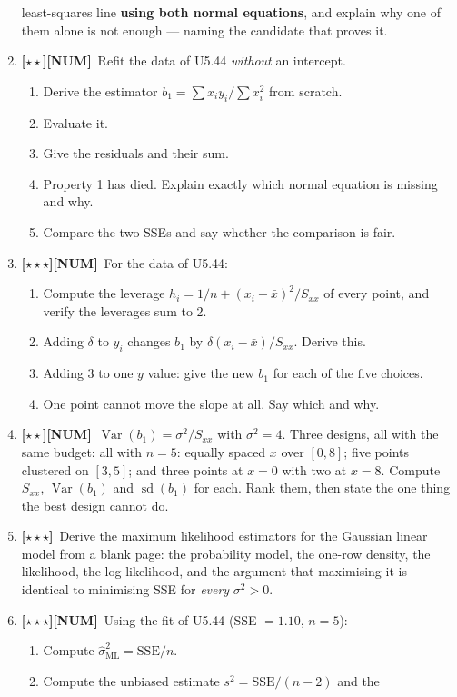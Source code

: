 \documentclass[11pt,a4paper]{article}
\newcommand{\LA}{{\footnotesize\textbf{[$\star\star\star$]}}}
\newcommand{\LB}{{\footnotesize\textbf{[$\star\star$]}}}
\newcommand{\NUM}{{\footnotesize\textbf{[NUM]}}}
\newcommand{\Q}[1]{\item[\textbf{#1}]}
\begin{document}
\begin{enumerate}[leftmargin=2.2cm]
  least-squares line \textbf{using both normal equations}, and explain why one
  of them alone is not enough --- naming the candidate that proves it.
\Q{U5.48}\LB\NUM\ Refit the data of U5.44 \emph{without} an intercept.
  \begin{enumerate}[label=(\alph*)]
    \item Derive the estimator $b_1 = \sum x_iy_i/\sum x_i^2$ from scratch.
    \item Evaluate it.
    \item Give the residuals and their sum.
    \item Property 1 has died. Explain exactly which normal equation is
      missing and why.
    \item Compare the two SSEs and say whether the comparison is fair.
  \end{enumerate}
\Q{U5.49}\LA\NUM\ For the data of U5.44:
  \begin{enumerate}[label=(\alph*)]
    \item Compute the leverage $h_i = 1/n + (x_i-\bar x)^2/S_{xx}$ of every
      point, and verify the leverages sum to 2.
    \item Adding $\delta$ to $y_i$ changes $b_1$ by $\delta(x_i-\bar x)/S_{xx}$.
      Derive this.
    \item Adding 3 to one $y$ value: give the new $b_1$ for each of the five
      choices.
    \item One point cannot move the slope at all. Say which and why.
  \end{enumerate}
\Q{U5.50}\LB\NUM\ $\operatorname{Var}(b_1) = \sigma^2/S_{xx}$ with
  $\sigma^2 = 4$. Three designs, all with the same budget:
  all with $n = 5$: equally spaced $x$ over $[0,8]$; five points clustered on
  $[3,5]$; and three points at $x=0$ with two at $x=8$.
  Compute $S_{xx}$, $\operatorname{Var}(b_1)$ and $\operatorname{sd}(b_1)$ for
  each. Rank them, then state the one thing the best design cannot do.
\Q{U5.51}\LA\ Derive the maximum likelihood estimators for the Gaussian linear
  model from a blank page: the probability model, the one-row density, the
  likelihood, the log-likelihood, and the argument that maximising it is
  identical to minimising SSE for \emph{every} $\sigma^2 > 0$.
\Q{U5.52}\LA\NUM\ Using the fit of U5.44 (SSE $= 1.10$, $n = 5$):
  \begin{enumerate}[label=(\alph*)]
    \item Compute $\hat\sigma^2_{\text{ML}} = \text{SSE}/n$.
    \item Compute the unbiased estimate $s^2 = \text{SSE}/(n-2)$ and the

\end{enumerate}
\end{enumerate}
\end{document}
